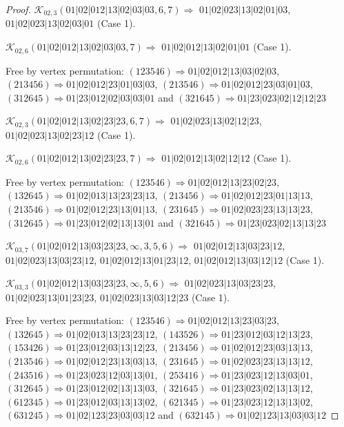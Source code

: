 \documentclass[12pt]{article}
\theoremstyle{plain}
\theoremstyle{definition}
\theoremstyle{remark}
\newcommand{\fancy}[1]{\mathcal{#1}}
\def\K{\fancy{K}}
\begin{document}
\begin{proof}
	
	
	\bigskip
	
	$\K_{02,3}(01|02|012|13|02|03|03,6, 7)\Rightarrow $ $01|02|023|13|02|01|03$, $01|02|023|13|02|03|01$ (Case 1).
	
	$\K_{02,6}(01|02|012|13|02|03|03,7)\Rightarrow $ $01|02|012|13|02|01|01$ (Case 1).
	
	
	
	Free by vertex permutation: $(1 2 3 5 4 6)\Rightarrow 01|02|012|13|03|02|03$, $(2 1 3 4 5 6)\Rightarrow 01|02|012|23|01|03|03$, $(2 1 3 5 4 6)\Rightarrow 01|02|012|23|03|01|03$, $(3 1 2 6 4 5)\Rightarrow 01|23|012|02|03|03|01$ and $(3 2 1 6 4 5)\Rightarrow 01|23|023|02|12|12|23$
	
	
	
	\bigskip
	
	$\K_{02,3}(01|02|012|13|02|23|23,6, 7)\Rightarrow $ $01|02|023|13|02|12|23$, $01|02|023|13|02|23|12$ (Case 1).
	
	$\K_{02,6}(01|02|012|13|02|23|23,7)\Rightarrow $ $01|02|012|13|02|12|12$ (Case 1).
	
	
	
	Free by vertex permutation: $(1 2 3 5 4 6)\Rightarrow 01|02|012|13|23|02|23$, $(1 3 2 6 4 5)\Rightarrow 01|02|013|13|23|23|13$, $(2 1 3 4 5 6)\Rightarrow 01|02|012|23|01|13|13$, $(2 1 3 5 4 6)\Rightarrow 01|02|012|23|13|01|13$, $(2 3 1 6 4 5)\Rightarrow 01|02|023|23|13|13|23$, $(3 1 2 6 4 5)\Rightarrow 01|23|012|02|13|13|01$ and $(3 2 1 6 4 5)\Rightarrow 01|23|023|02|13|13|23$
	
	
	
	\bigskip
	
	$\K_{03,7}(01|02|012|13|03|23|23,\infty,3, 5, 6)\Rightarrow $ $01|02|012|13|03|23|12$, $01|02|023|13|03|23|12$, $01|02|012|13|01|23|12$, $01|02|012|13|03|12|12$ (Case 1).
	
	$\K_{03,3}(01|02|012|13|03|23|23,\infty,5, 6)\Rightarrow $ $01|02|023|13|03|23|23$, $01|02|023|13|01|23|23$, $01|02|023|13|03|12|23$ (Case 1).
	
	
	
	Free by vertex permutation: $(1 2 3 5 4 6)\Rightarrow 01|02|012|13|23|03|23$, $(1 3 2 6 4 5)\Rightarrow 01|02|013|13|23|23|12$, $(1 4 3 5 2 6)\Rightarrow 01|23|012|03|12|13|23$, $(1 5 3 4 2 6)\Rightarrow 01|23|012|03|13|12|23$, $(2 1 3 4 5 6)\Rightarrow 01|02|012|23|03|13|13$, $(2 1 3 5 4 6)\Rightarrow 01|02|012|23|13|03|13$, $(2 3 1 6 4 5)\Rightarrow 01|02|023|23|13|13|12$, $(2 4 3 5 1 6)\Rightarrow 01|23|023|12|03|13|01$, $(2 5 3 4 1 6)\Rightarrow 01|23|023|12|13|03|01$, $(3 1 2 6 4 5)\Rightarrow 01|23|012|02|13|13|03$, $(3 2 1 6 4 5)\Rightarrow 01|23|023|02|13|13|12$, $(6 1 2 3 4 5)\Rightarrow 01|23|012|03|13|13|02$, $(6 2 1 3 4 5)\Rightarrow 01|23|023|12|13|13|02$, $(6 3 1 2 4 5)\Rightarrow 01|02|123|23|03|03|12$ and $(6 3 2 1 4 5)\Rightarrow 01|02|123|13|03|03|12$
	

\end{proof}
\end{document}
